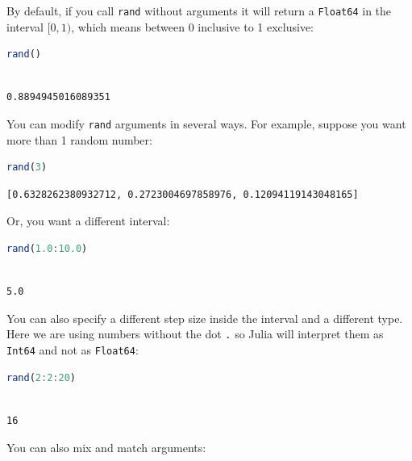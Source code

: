 \documentclass[
  notoc %
]{tufte-book}
\newcommand{\passthrough}[1]{#1}
\begin{document}
By default, if you call \passthrough{\lstinline!rand!} without arguments
it will return a \passthrough{\lstinline!Float64!} in the interval
\([0, 1)\), which means between 0 inclusive to 1 exclusive:

\begin{lstlisting}[language=Julia]
rand()
\end{lstlisting}

\begin{lstlisting}[language=Output]

0.8894945016089351

\end{lstlisting}

You can modify \passthrough{\lstinline!rand!} arguments in several ways.
For example, suppose you want more than 1 random number:

\begin{lstlisting}[language=Julia]
rand(3)
\end{lstlisting}

\begin{lstlisting}[language=Output]
[0.6328262380932712, 0.2723004697858976, 0.12094119143048165]
\end{lstlisting}

Or, you want a different interval:

\begin{lstlisting}[language=Julia]
rand(1.0:10.0)
\end{lstlisting}

\begin{lstlisting}[language=Output]

5.0

\end{lstlisting}

You can also specify a different step size inside the interval and a
different type. Here we are using numbers without the dot
\passthrough{\lstinline!.!} so Julia will interpret them as
\passthrough{\lstinline!Int64!} and not as
\passthrough{\lstinline!Float64!}:

\begin{lstlisting}[language=Julia]
rand(2:2:20)
\end{lstlisting}

\begin{lstlisting}[language=Output]

16

\end{lstlisting}

You can also mix and match arguments:
\end{document}
